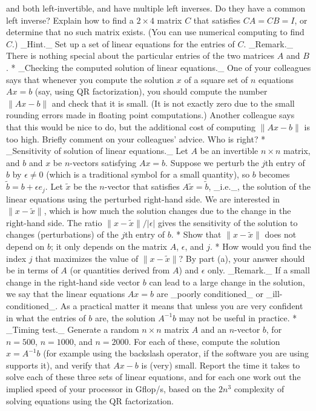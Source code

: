and both left-invertible, and have multiple left inverses. Do they have a common left inverse? Explain how to find a \(2\times 4\) matrix \(C\) that satisfies \(CA=CB=I\), or determine that no such matrix exists. (You can use numerical computing to find \(C\).) _Hint._ Set up a set of linear equations for the entries of \(C\). _Remark._ There is nothing special about the particular entries of the two matrices \(A\) and \(B\).
* _Checking the computed solution of linear equations._ One of your colleagues says that whenever you compute the solution \(x\) of a square set of \(n\) equations \(Ax=b\) (say, using QR factorization), you should compute the number \(\|Ax-b\|\) and check that it is small. (It is not exactly zero due to the small rounding errors made in floating point computations.) Another colleague says that this would be nice to do, but the additional cost of computing \(\|Ax-b\|\) is too high. Briefly comment on your colleagues' advice. Who is right?
* _Sensitivity of solution of linear equations._ Let \(A\) be an invertible \(n\times n\) matrix, and \(b\) and \(x\) be \(n\)-vectors satisfying \(Ax=b\). Suppose we perturb the \(j\)th entry of \(b\) by \(\epsilon\neq 0\) (which is a traditional symbol for a small quantity), so \(b\) becomes \(\tilde{b}=b+\epsilon e_{j}\). Let \(\tilde{x}\) be the \(n\)-vector that satisfies \(A\tilde{x}=\tilde{b}\), _i.e._, the solution of the linear equations using the perturbed right-hand side. We are interested in \(\|x-\tilde{x}\|\), which is how much the solution changes due to the change in the right-hand side. The ratio \(\|x-\tilde{x}\|/|\epsilon|\) gives the sensitivity of the solution to changes (perturbations) of the \(j\)th entry of \(b\).
* Show that \(\|x-\tilde{x}\|\) does not depend on \(b\); it only depends on the matrix \(A\), \(\epsilon\), and \(j\).
* How would you find the index \(j\) that maximizes the value of \(\|x-\tilde{x}\|\)? By part (a), your answer should be in terms of \(A\) (or quantities derived from \(A\)) and \(\epsilon\) only. _Remark._ If a small change in the right-hand side vector \(b\) can lead to a large change in the solution, we say that the linear equations \(Ax=b\) are _poorly conditioned_ or _ill-conditioned_. As a practical matter it means that unless you are very confident in what the entries of \(b\) are, the solution \(A^{-1}b\) may not be useful in practice.
* _Timing test._ Generate a random \(n\times n\) matrix \(A\) and an \(n\)-vector \(b\), for \(n=500\), \(n=1000\), and \(n=2000\). For each of these, compute the solution \(x=A^{-1}b\) (for example using the backslash operator, if the software you are using supports it), and verify that \(Ax-b\) is (very) small. Report the time it takes to solve each of these three sets of linear equations, and for each one work out the implied speed of your processor in Gflop/s, based on the \(2n^{3}\) complexity of solving equations using the QR factorization.
